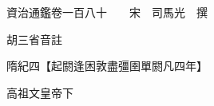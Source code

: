 










 


 
 


 

  
  
  
  
  





  
  
  
  
  
 
  

  

  
  
  



  

 
 

  
   




  

  
  


  　　資治通鑑卷一百八十　　宋　司馬光　撰

　　胡三省音註

　　隋紀四【起閼逢困敦盡彊圉單閼凡四年】

　　高祖文皇帝下

